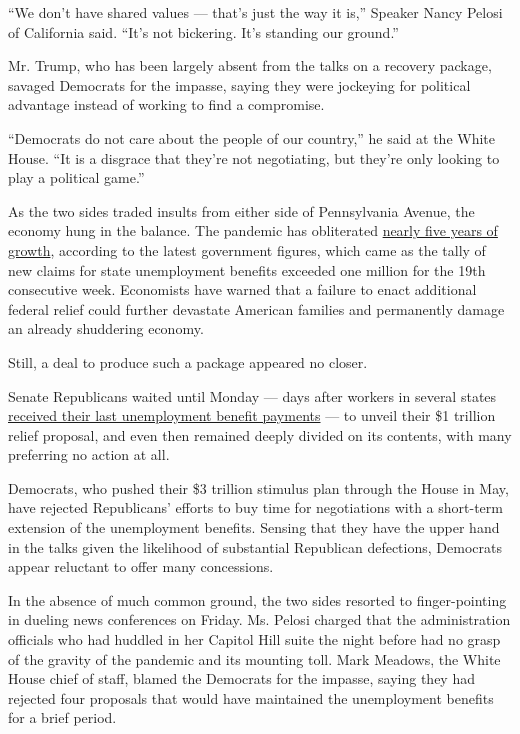 ``We don't have shared values --- that's just the way it is,'' Speaker
Nancy Pelosi of California said. ``It's not bickering. It's standing our
ground.''

Mr. Trump, who has been largely absent from the talks on a recovery
package, savaged Democrats for the impasse, saying they were jockeying
for political advantage instead of working to find a compromise.

``Democrats do not care about the people of our country,'' he said at
the White House. ``It is a disgrace that they're not negotiating, but
they're only looking to play a political game.''

As the two sides traded insults from either side of Pennsylvania Avenue,
the economy hung in the balance. The pandemic has obliterated
\href{https://www.nytimes3xbfgragh.onion/2020/07/30/business/economy/q2-gdp-coronavirus-economy.html}{nearly
five years of growth}, according to the latest government figures, which
came as the tally of new claims for state unemployment benefits exceeded
one million for the 19th consecutive week. Economists have warned that a
failure to enact additional federal relief could further devastate
American families and permanently damage an already shuddering economy.

Still, a deal to produce such a package appeared no closer.

Senate Republicans waited until Monday --- days after workers in several
states
\href{https://www.nytimes3xbfgragh.onion/2020/07/21/business/economy/coronavirus-unemployment-benefits.html}{received
their last unemployment benefit payments} --- to unveil their \$1
trillion relief proposal, and even then remained deeply divided on its
contents, with many preferring no action at all.

Democrats, who pushed their \$3 trillion stimulus plan through the House
in May, have rejected Republicans' efforts to buy time for negotiations
with a short-term extension of the unemployment benefits. Sensing that
they have the upper hand in the talks given the likelihood of
substantial Republican defections, Democrats appear reluctant to offer
many concessions.

In the absence of much common ground, the two sides resorted to
finger-pointing in dueling news conferences on Friday. Ms. Pelosi
charged that the administration officials who had huddled in her Capitol
Hill suite the night before had no grasp of the gravity of the pandemic
and its mounting toll. Mark Meadows, the White House chief of staff,
blamed the Democrats for the impasse, saying they had rejected four
proposals that would have maintained the unemployment benefits for a
brief period.

